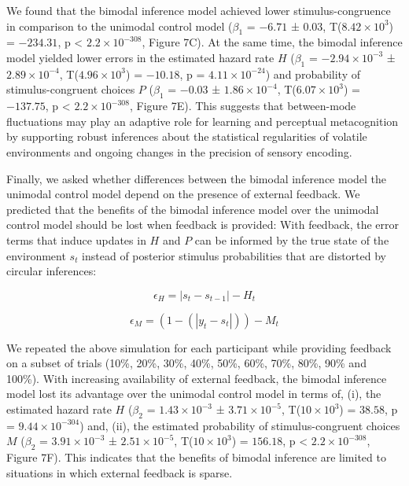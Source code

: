 \documentclass[
]{article}
\begin{document}
We found that the bimodal inference model achieved lower
stimulus-congruence in comparison to the unimodal control model
(\(\beta_1\) = \(-6.71\) ± \(0.03\),
T(\(\ensuremath{8.42\times 10^{3}}\)) = \(-234.31\), p < \(\ensuremath{2.2\times 10^{-308}}\), Figure
7C). At the same time, the bimodal inference model yielded lower errors
in the estimated hazard rate \(H\) (\(\beta_1\) =
\(\ensuremath{-2.94\times 10^{-3}}\) ±
\(\ensuremath{2.89\times 10^{-4}}\),
T(\(\ensuremath{4.96\times 10^{3}}\)) = \(-10.18\), p =
\(\ensuremath{4.11\times 10^{-24}}\)) and probability of
stimulus-congruent choices \(P\) (\(\beta_1\) = \(-0.03\) ±
\(\ensuremath{1.86\times 10^{-4}}\),
T(\(\ensuremath{6.07\times 10^{3}}\)) = \(-137.75\), p < \(\ensuremath{2.2\times 10^{-308}}\), Figure
7E). This suggests that between-mode fluctuations may play an adaptive
role for learning and perceptual metacognition by supporting robust
inferences about the statistical regularities of volatile environments
and ongoing changes in the precision of sensory encoding.

Finally, we asked whether differences between the bimodal inference
model the unimodal control model depend on the presence of external
feedback. We predicted that the benefits of the bimodal inference model
over the unimodal control model should be lost when feedback is
provided: With feedback, the error terms that induce updates in \(H\)
and \(P\) can be informed by the true state of the environment \(s_t\)
instead of posterior stimulus probabilities that are distorted by
circular inferences:

\begin{equation}
\epsilon_H = |s_t - s_{t-1}| - H_t
\end{equation}

\begin{equation}
\epsilon_M = (1- (|y_t - s_t|)) - M_t
\end{equation}

We repeated the above simulation for each participant while providing
feedback on a subset of trials (10\%, 20\%, 30\%, 40\%, 50\%, 60\%,
70\%, 80\%, 90\% and 100\%). With increasing availability of external
feedback, the bimodal inference model lost its advantage over the
unimodal control model in terms of, (i), the estimated hazard rate \(H\)
(\(\beta_2\) = \(\ensuremath{1.43\times 10^{-3}}\) ±
\(\ensuremath{3.71\times 10^{-5}}\), T(\(\ensuremath{10\times 10^{3}}\))
= \(38.58\), p = \(\ensuremath{9.44\times 10^{-304}}\)) and, (ii), the
estimated probability of stimulus-congruent choices \(M\) (\(\beta_2\) =
\(\ensuremath{3.91\times 10^{-3}}\) ±
\(\ensuremath{2.51\times 10^{-5}}\), T(\(\ensuremath{10\times 10^{3}}\))
= \(156.18\), p < \(\ensuremath{2.2\times 10^{-308}}\), Figure 7F). This indicates that the benefits of
bimodal inference are limited to situations in which external feedback
is sparse.
\end{document}
